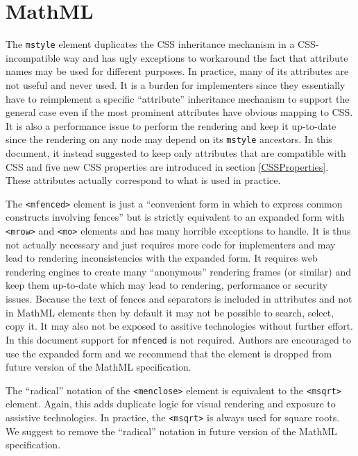 \appendix

\section{MathML}

The {\tt mstyle} element duplicates the CSS inheritance mechanism in a
CSS-incompatible way and has ugly exceptions to workaround the fact that
attribute names may be used for different purposes. In practice, many of its
attributes are not useful and never used. It is a burden for implementers since
they essentially have to reimplement a specific ``attribute'' inheritance
mechanism to support the general case even if the most prominent attributes
have obvious mapping to CSS. It is also a performance issue to perform the
rendering and keep it up-to-date since the rendering on any node may depend on
its {\tt mstyle} ancestors. In this document, it instead suggested to keep only
attributes that are compatible with CSS and five new CSS properties are
introduced in section \ref{CSSProperties}.
These attributes actually correspond to what is used in practice.

The {\tt <mfenced>} element is just a
``convenient form in which to express common constructs involving fences''
but is strictly equivalent to an expanded form with {\tt <mrow>} and
{\tt <mo>} elements and has many horrible exceptions to handle.
It is thus not actually necessary and just requires more
code for implementers and may lead to rendering inconsistencies with the
expanded form. It requires web rendering engines to create many
``anonymous'' rendering frames (or similar) and keep them up-to-date which may
lead to rendering, performance or security issues. Because the text of fences
and separators is included in attributes and not in MathML elements then by
default it may not be possible to search, select, copy it. It may also not be
exposed to assitive technologies without further effort. In this document
support for {\tt mfenced} is not required.
Authors are encouraged to use the expanded form and we recommend that the
element is dropped from future version of the MathML specification.

The ``radical'' notation of the {\tt <menclose>} element is equivalent to the
{\tt <msqrt>} element. Again, this adds duplicate logic for visual rendering and
exposure to assistive technologies. In practice, the {\tt <msqrt>} is always
used for square roots. We suggest to remove the ``radical'' notation in
future version of the MathML specification.


